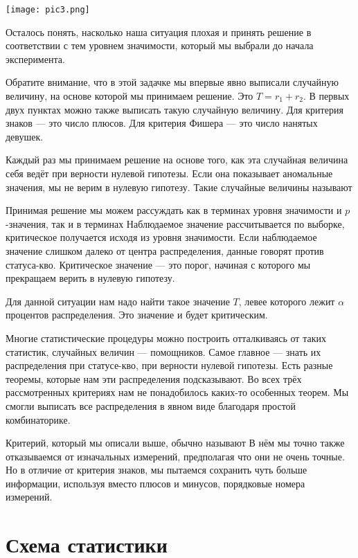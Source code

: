 \documentclass[12pt, a4paper, oneside]{article}
\begin{document}
\begin{center} 
\texttt{[image: pic3.png]}
\end{center} 

Осталось понять, насколько наша ситуация плохая и принять решение в соответствии с тем уровнем значимости, который мы выбрали до начала эксперимента. 

Обратите внимание, что в этой задачке мы впервые явно выписали случайную величину, на основе которой мы принимаем решение. Это $T = r_1 + r_2$. В первых двух пунктах можно также выписать такую случайную величину. Для критерия знаков --- это число плюсов. Для критерия Фишера --- это число нанятых девушек. 

Каждый раз мы принимаем решение на основе того, как эта случайная величина себя ведёт при верности нулевой гипотезы. Если она показывает аномальные значения, мы не верим в нулевую гипотезу. Такие случайные величины называют  

Принимая решение мы можем рассуждать как в терминах уровня значимости и $p$-значения, так и в терминах    Наблюдаемое значение рассчитывается по выборке, критическое получается исходя из уровня значимости. Если наблюдаемое значение слишком далеко от центра распределения, данные говорят против статуса-кво. Критическое значение --- это порог, начиная с которого мы прекращаем верить в нулевую гипотезу.

Для данной ситуации нам надо найти такое значение $T$, левее которого лежит $\alpha$ процентов распределения. Это значение и будет критическим. 

Многие статистические процедуры можно построить отталкиваясь от таких статистик,  случайных величин --- помощников. Самое главное --- знать их распределения при статусе-кво, при верности нулевой гипотезы. Есть разные теоремы, которые нам эти распределения подсказывают. Во всех трёх рассмотренных критериях нам не понадобилось каких-то особенных теорем. Мы смогли выписать все распределения в явном виде благодаря простой комбинаторике. 

Критерий, который мы описали выше, обычно называют  В нём мы точно также отказываемся от изначальных измерений, предполагая что они не очень точные. Но в отличие от критерия знаков, мы пытаемся сохранить чуть больше информации, используя вместо плюсов и минусов, порядковые номера измерений.


\section{Схема статистики}
\end{document}
